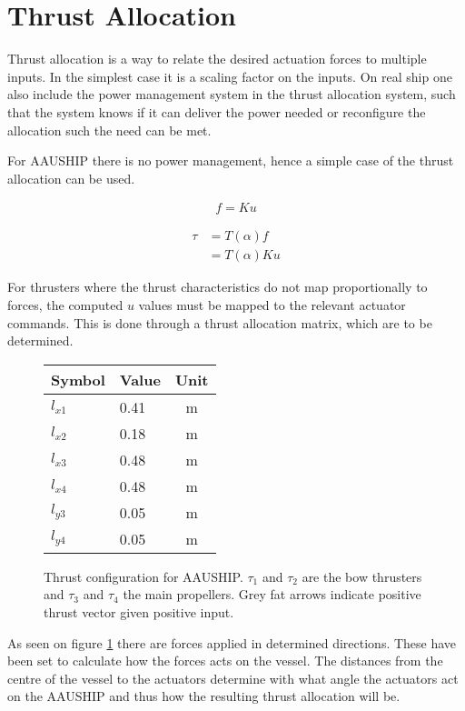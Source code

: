 \section{Thrust Allocation}
\label{sec:thrust_allocation}
Thrust allocation is a way to relate the desired actuation forces to multiple inputs. In the simplest case it is a scaling factor on the inputs. On real ship one also include the power management system in the thrust allocation system, such that the system knows if it can deliver the power needed or reconfigure the allocation such the need can be met.

For AAUSHIP there is no power management, hence a simple case of the thrust allocation can be used.

\begin{align}
f  = K u
\label{eq:fKu}
\end{align}

\begin{subequations}
\begin{align}
 \tau &=  T ( \alpha)  f\\
&=  T (  \alpha)  K  u
\end{align}
\end{subequations}

For thrusters where the thrust characteristics do not map
proportionally to forces, the computed $u$ values must be mapped
to the relevant actuator commands. This is done through a thrust allocation matrix, which are to be determined.

\begin{figure}[htbp]
	\centering
	\begin{minipage}[l]{0.3\textwidth}
		\begin{tabular}{llc}
		\toprule
		Symbol & Value & Unit\\
		\midrule
		$l_{x1}$& 0.41 & m\\
		$l_{x2}$& 0.18 & m\\
		$l_{x3}$& 0.48 & m\\
		$l_{x4}$& 0.48 & m\\
		$l_{y3}$& 0.05 & m\\
		$l_{y4}$& 0.05 & m\\
		\bottomrule
		\end{tabular}
	\end{minipage}%
\noindent
	\begin{minipage}[l]{0.7\textwidth}
		
	\end{minipage}
	\caption{Thrust configuration for AAUSHIP. $\tau_1$ and $\tau_2$ are the
	bow thrusters and $\tau_3$ and $\tau_4$ the main propellers. Grey fat
arrows indicate positive thrust vector given positive input.} 
	\label{fig:thrust_allocation}
\end{figure}
As seen on figure \ref{sec:thrust_allocation} there are forces applied in determined directions. These have been set to calculate how the forces acts on the vessel. The distances from the centre of the vessel to the actuators determine with what angle the actuators act on the AAUSHIP and thus how the resulting thrust allocation will be.

